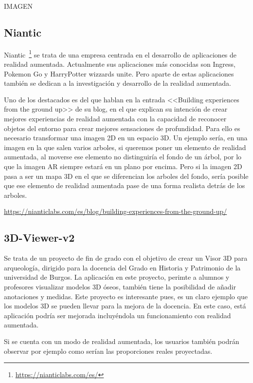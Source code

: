 IMAGEN

\subsection{Niantic}
Niantic~\footnote{\url{https://nianticlabs.com/es/}} se trata de una empresa centrada en el desarrollo de aplicaciones de realidad aumentada. Actualmente sus aplicaciones más conocidas son Ingress, Pokemon Go y HarryPotter wizzards unite.
Pero aparte de estas aplicaciones también se dedican a la investigación y desarrollo de la realidad aumentada.

Uno de los destacados es del que hablan en la entrada <<Building experiences from the ground up>> de su blog, en el que explican su intención de crear mejores experiencias de realidad aumentada con
la capacidad de reconocer objetos del entorno para crear mejores sensaciones de profundidad. Para ello es necesario transformar una imagen 2D en un espacio 3D. Un ejemplo sería, en una imagen en la que salen varios arboles, si queremos poner un elemento de realidad aumentada, al moverse ese elemento no distinguiría el fondo de un árbol, por lo que la imagen AR siempre estará en un plano por encima. Pero si la imagen 2D pasa a ser un mapa 3D en el que se diferencian los arboles del fondo, sería posible que ese elemento de realidad aumentada pase de una forma realista detrás de los arboles. 

\url{https://nianticlabs.com/es/blog/building-experiences-from-the-ground-up/}



\subsection{3D-Viewer-v2}

Se trata de un proyecto de fin de grado con el objetivo de crear un Visor 3D para arqueología, dirigido para la docencia del Grado en Historia y Patrimonio de la universidad de Burgos.
La aplicación en este proyecto, perimte a alumnos y profesores visualizar modelos 3D óseos, también tiene la posibilidad de añadir anotaciones y medidas. Este proyecto es interesante pues, es un claro ejemplo que los modelos 3D se pueden llevar para la mejora de la docencia. En este caso, está aplicación podría ser mejorada incluyéndola un funcionamiento con realidad aumentada.

Si se cuenta con un modo de realidad aumentada, los usuarios también podrán observar por ejemplo como serían las proporciones reales proyectadas.

